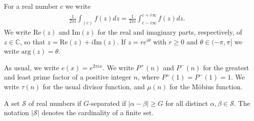 \documentclass[12pt]{amsart}
\theoremstyle{plain}
\theoremstyle{definition}
\theoremstyle{remark}
\begin{document}
For a real number $c$ we write
\begin{align*}
\frac{1}{2\pi i}\int_{(c)} f(z) dz = \frac{1}{2\pi i}\int_{c-i\infty}^{c+i\infty} f(z) dz.
\end{align*}
We write $\text{Re}(z)$ and $\text{Im}(z)$ for the real and imaginary parts, respectively, of $z \in \mathbb{C}$, so that $z = \text{Re}(z) + i\text{Im}(z)$. If $z = re^{i\theta}$ with $r\geq 0$ and $\theta \in (-\pi,\pi]$ we write $\text{arg}(z) = \theta$.

As usual, we write $e(x) = e^{2\pi i x}$. We write $P^+(n)$ and $P^-(n)$ for the greatest and least prime factor of a positive integer $n$, where $P^+(1) = P^-(1) = 1$. We write $\tau(n)$ for the usual divisor function, and $\mu(n)$ for the M\"obius function.

A set $\mathcal{S}$ of real numbers if $G$-separated if $|\alpha - \beta| \geq G$ for all distinct $\alpha,\beta \in \mathcal{S}$. The notation $|\mathcal{S}|$ denotes the cardinality of a finite set.
%
%
%
%
\end{document}
